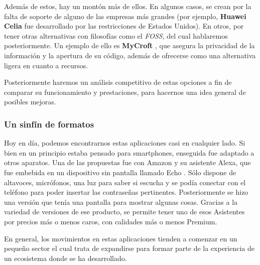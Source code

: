 Además de estos, hay un montón más de ellos. En algunos casos, se crean por la falta de soporte de alguno de las empresas más grandes (por ejemplo, \textbf{Huawei Celia} \cite{huawei-celia} fue desarrollado por las restricciones de Estados Unidos). En otros, por tener otras alternativas con filosofías como el \textit{FOSS}, del cual hablaremos posteriormente. Un ejemplo de ello es \textbf{MyCroft} \cite{mycroft}, que asegura la privacidad de la información y la apertura de su código, además de ofrecerse como una alternativa ligera en cuanto a recursos.

Posteriormente haremos un análisis competitivo de estas opciones a fin de comparar su funcionamiento y prestaciones, para hacernos una idea general de posibles mejoras.


\subsubsection{Un sinfín de formatos}
Hoy en día, podemos encontrarnos estas aplicaciones casi en cualquier lado. Si bien en un principio estaba pensado para smartphones, enseguida fue adaptado a otros aparatos.
Una de las propuestas fue con Amazon y su asistente Alexa, que fue embebida en un dispositivo sin pantalla llamado Echo \cite{echo}. Sólo dispone de altavoces, micrófonos, una luz para saber si escucha y se podía conectar con el teléfono para poder insertar las contraseñas pertinentes. Posteriormente se hizo una versión que tenía una pantalla para mostrar algunas cosas.
Gracias a la variedad de versiones de ese producto, se permite tener uno de esos Asistentes por precios más o menos caros, con calidades más o menos Premium.

En general, los movimientos en estas aplicaciones tienden a comenzar en un pequeño sector el cual trata de expandirse para formar parte de la experiencia de un ecosistema donde se ha desarrollado.

